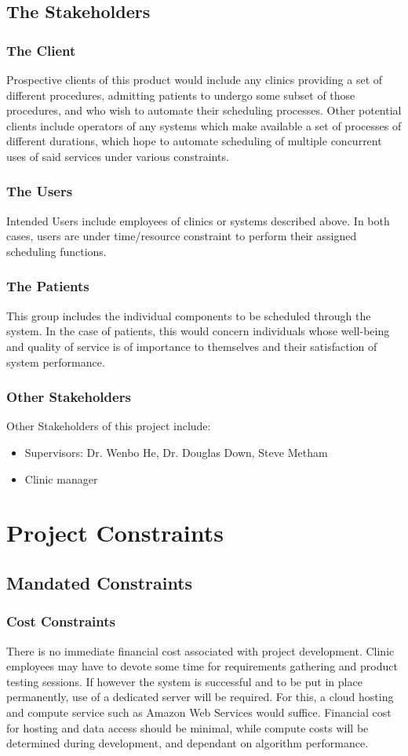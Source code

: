 \documentclass[12pt, titlepage]{article}
\begin{document}
\subsection{The Stakeholders}
\subsubsection{The Client}
Prospective clients of this product would include any clinics providing a set of different procedures, admitting patients to undergo some subset of those procedures, and who wish to automate their scheduling processes. Other potential clients include operators of any systems which make available a set of processes of different durations, which hope to automate scheduling of multiple concurrent uses of said services under various constraints.
\subsubsection{The Users}
Intended Users include employees of clinics or systems described above. In both cases, users are under time/resource constraint to perform their assigned scheduling functions.
\subsubsection{The Patients}
This group includes the individual components to be scheduled through the system. In the case of patients, this would concern individuals whose well-being and quality of service is of importance to themselves and their satisfaction of system performance.
\subsubsection{Other Stakeholders}
Other Stakeholders of this project include:
\begin{itemize}
  \item     Supervisors: Dr. Wenbo He, Dr. Douglas Down, Steve Metham
  \item 	Clinic manager
\end{itemize}

\section{Project Constraints}
\subsection{Mandated Constraints}
\subsubsection{Cost Constraints}
There is no immediate financial cost associated with project development. Clinic employees may have to devote some time for requirements gathering and product testing sessions. If however the system is successful and to be put in place permanently, use of a dedicated server will be required. For this, a cloud hosting and compute service such as Amazon Web Services would suffice. Financial cost for hosting and data access should be minimal, while compute costs will be determined during development, and dependant on algorithm performance.
\newline
\end{document}
